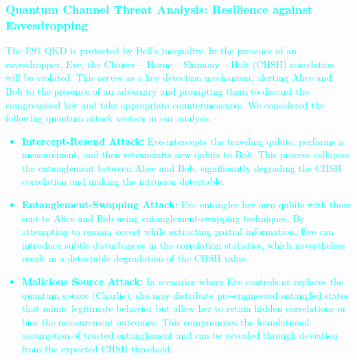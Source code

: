 \documentclass[a4paper]{cas-sc}
\begin{document}
\subsubsection{\textcolor{cyan}{Quantum Channel Threat Analysis: Resilience against Eavesdropping}}
\textcolor{cyan}{The E91 QKD is protected by Bell's inequality. In the presence of an eavesdropper, Eve, the Clauser -- Horne -- Shimony -- Holt (CHSH) correlation \cite{PhysRevLett.23.880} will be violated. This serves as a key detection mechanism, alerting Alice and Bob to the presence of an adversary and prompting them to discard the compromised key and take appropriate countermeasures. We considered the following quantum attack vectors in our analysis --
    \begin{itemize}
        \item \textbf{Intercept-Resend Attack:} Eve intercepts the traveling qubits, performs a measurement, and then retransmits new qubits to Bob. This process collapses the entanglement between Alice and Bob, significantly degrading the CHSH correlation and making the intrusion detectable.
        \item \textbf{Entanglement-Swapping Attack:} Eve entangles her own qubits with those sent to Alice and Bob using entanglement-swapping techniques. By attempting to remain covert while extracting partial information, Eve can introduce subtle disturbances in the correlation statistics, which nevertheless result in a detectable degradation of the CHSH value.
        \item  \textbf{Malicious Source Attack:} In scenarios where Eve controls or replaces the quantum source (Charlie), she may distribute pre-engineered entangled states that mimic legitimate behavior but allow her to retain hidden correlations or bias the measurement outcomes. This compromises the foundational assumption of trusted entanglement and can be revealed through deviation from the expected CHSH threshold.
    \end{itemize}}
\end{document}
